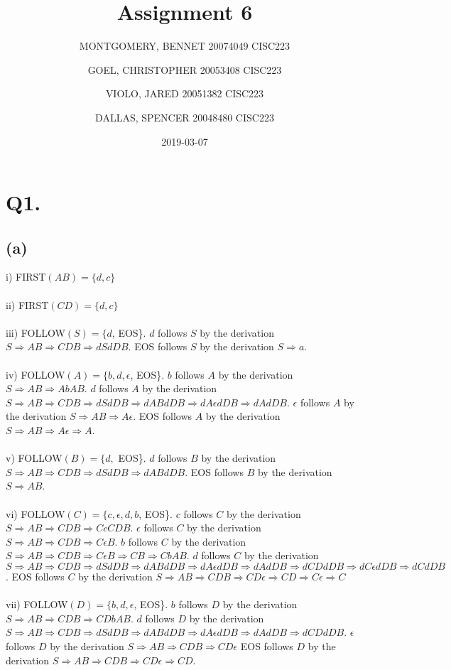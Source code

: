 \documentclass{article}
\title{Assignment 6}
\date{2019-03-07}
\author{MONTGOMERY, BENNET 20074049 CISC223
		\and GOEL, CHRISTOPHER 20053408 CISC223\\
		\and VIOLO, JARED 20051382 CISC223\\
		\and DALLAS, SPENCER 20048480 CISC223
		}
\begin{document}
	\maketitle
	
	\section*{Q1.}
	\subsection*{(a)}
	i) FIRST$(AB) = \{d, c\}$\\\\
	ii) FIRST$(CD) = \{d, c\}$\\\\
	iii) FOLLOW$(S) = \{d$, EOS\}. $d$ follows $S$ by the derivation $S \Rightarrow AB \Rightarrow CDB \Rightarrow dSdDB$. EOS follows $S$ by the derivation $S \Rightarrow a$.\\\\
	iv) FOLLOW$(A) = \{b, d, \epsilon$, EOS\}. $b$ follows $A$ by the derivation $S \Rightarrow AB \Rightarrow AbAB$. $d$ follows $A$ by the derivation $S \Rightarrow AB \Rightarrow CDB \Rightarrow dSdDB \Rightarrow dABdDB \Rightarrow dA\epsilon dDB \Rightarrow dAdDB$. $\epsilon$ follows $A$ by the derivation $S \Rightarrow AB \Rightarrow A\epsilon$. EOS follows $A$ by the derivation $S \Rightarrow AB \Rightarrow A\epsilon \Rightarrow A$.\\\\
	v) FOLLOW$(B) = \{d,$ EOS\}. $d$ follows $B$ by the derivation $S \Rightarrow AB \Rightarrow CDB \Rightarrow dSdDB \Rightarrow dABdDB$. EOS follows $B$ by the derivation $S \Rightarrow AB$.\\\\
	vi) FOLLOW$(C) = \{c, \epsilon, d, b$, EOS\}. $c$ follows $C$ by the derivation $S \Rightarrow AB \Rightarrow CDB \Rightarrow CcCDB$. $\epsilon$ follows $C$ by the derivation $S \Rightarrow AB \Rightarrow CDB \Rightarrow C\epsilon B$. $b$ follows $C$ by the derivation $S \Rightarrow AB \Rightarrow CDB \Rightarrow C\epsilon B \Rightarrow CB \Rightarrow CbAB$. $d$ follows $C$ by the derivation $S \Rightarrow AB \Rightarrow CDB \Rightarrow dSdDB \Rightarrow dABdDB \Rightarrow dA\epsilon dDB \Rightarrow dAdDB \Rightarrow dCDdDB \Rightarrow dC\epsilon dDB \Rightarrow dCdDB$. EOS follows $C$ by the derivation $S \Rightarrow AB \Rightarrow CDB \Rightarrow CD\epsilon \Rightarrow CD \Rightarrow C\epsilon \Rightarrow C$\\\\
	vii) FOLLOW$(D) = \{b, d, \epsilon$, EOS\}. $b$ follows $D$ by the derivation $S \Rightarrow AB \Rightarrow CDB \Rightarrow CDbAB$. $d$ follows $D$ by the derivation $S \Rightarrow AB \Rightarrow CDB \Rightarrow dSdDB \Rightarrow dABdDB \Rightarrow dA\epsilon dDB \Rightarrow dAdDB \Rightarrow dCDdDB$. $\epsilon$ follows $D$ by the derivation $S \Rightarrow AB \Rightarrow CDB \Rightarrow CD\epsilon$ EOS follows $D$ by the derivation $S \Rightarrow AB \Rightarrow CDB \Rightarrow CD\epsilon \Rightarrow CD$.
\end{document}
